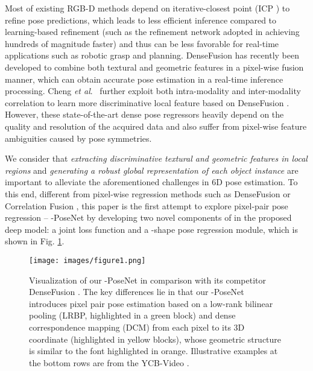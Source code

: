 \documentclass[letterpaper, 10 pt, conference]{ieeeconf}
\def\etal{\emph{et al}.~}
\begin{document}
Most of existing RGB-D methods \cite{xiang2017posecnn,sundermeyer2018implicit,kehl2017ssd} depend on iterative-closest point (ICP \cite{besl1992method}) to refine pose predictions, which leads to less efficient inference compared to learning-based refinement (such as the refinement network adopted in \cite{wang2019densefusion} achieving hundreds of magnitude faster) and thus can be less favorable for real-time applications such as robotic grasp and planning.
DenseFusion \cite{wang2019densefusion} has recently been developed to combine both textural and geometric features in a pixel-wise fusion manner, which can obtain accurate pose estimation in a real-time inference processing.
Cheng \etal \cite{cheng20196d} further exploit both intra-modality and inter-modality correlation to learn more discriminative local feature based on DenseFusion \cite{wang2019densefusion}.
However, these state-of-the-art dense pose regressors heavily depend on the quality and resolution of the acquired data and also suffer from pixel-wise feature ambiguities caused by pose symmetries.


We consider that \textit{extracting discriminative textural and geometric features in local regions} and \textit{generating a robust global representation of each object instance} are important to alleviate the aforementioned challenges in 6D pose estimation.  
To this end, different from pixel-wise regression methods such as DenseFusion \cite{wang2019densefusion} or Correlation Fusion \cite{cheng20196d}, this paper is the first attempt to explore pixel-pair pose regression -- -PoseNet by developing two novel components of in the proposed deep model: a joint loss function and a -shape pose regression module, which is shown in Fig. \ref{fig:intro}.

\begin{figure}[t]
\centering
\texttt{[image: images/figure1.png]}
\caption{Visualization of our -PoseNet in comparison with its competitor DenseFusion \cite{wang2019densefusion}.
The key differences lie in that our -PoseNet introduces pixel pair pose estimation based on a low-rank bilinear pooling (LRBP, highlighted in a green block) and dense correspondence mapping (DCM) from each pixel to its 3D coordinate (highlighted in yellow blocks), whose geometric structure is similar to the font  highlighted in orange. Illustrative examples at the bottom rows are from the YCB-Video \cite{xiang2017posecnn}. }
\label{fig:intro}\vspace{-0.6cm}
\end{figure}
\end{document}
